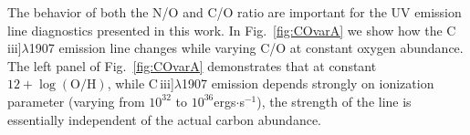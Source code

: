 \documentclass[preprint2]{aastex61}
\newcommand{\Cloudy}{\textsc{Cloudy}\xspace}
\newcommand{\ciii}{C\,{\sc iii}]\xspace}
\begin{document}

The behavior of both the N/O and C/O ratio are important for the UV emission line diagnostics presented in this work. In Fig.~\ref{fig:COvarA} we show how the \ciii$\lambda$1907 emission line changes while varying C/O at constant oxygen abundance. The left panel of Fig.~\ref{fig:COvarA} demonstrates that at constant $12 + \log (\mathrm{O}/\mathrm{H})$, while \ciii$\lambda$1907 emission depends strongly on ionization parameter (varying from $10^{32}$ to $10^{36}$ergs$\cdot$s$^{-1}$), the strength of the line is essentially independent of the actual carbon abundance. 

\end{document}

